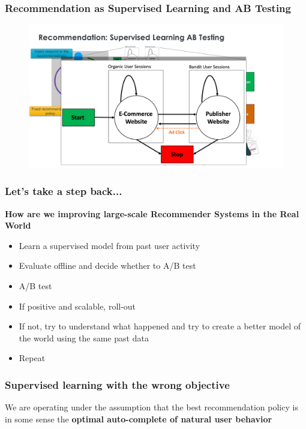       


\begin{frame}
\frametitle{Recommendation as Supervised Learning and AB Testing}


 \begin{figure}[h!]
   \includegraphics[scale=0.3]{images/recoasabtesting.png}
     \centering
     \label{motex1}
 \end{figure}
   
\end{frame}



\begin{frame}
  \frametitle{Let's take a step back...}
  
  \textbf{How are we improving large-scale Recommender Systems in the Real World}
  
  \begin{itemize}
  \item Learn a supervised model from past user activity
  \item Evaluate offline and decide whether to A/B test
  \item A/B test
  \item If positive and scalable, roll-out
  \item If not, try to understand what happened and try to create a better model of the world using the same past data
  \item Repeat
  \end{itemize}
        
  \end{frame}
  

  
  \begin{frame}
    \frametitle{Supervised learning with the wrong objective}
  
  We are operating under the assumption that the best recommendation policy is in some sense the \textbf{optimal auto-complete of natural user behavior}
  
  \end{frame}
  
